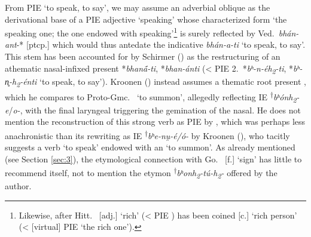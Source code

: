 \documentclass[output=paper,colorlinks,citecolor=brown]{langscibook}
\begin{document}
From PIE  ‘to speak, to say’, we may assume an adverbial oblique  as the derivational base of a  PIE adjective    ‘speaking’ whose characterized form  ‘the speaking one; the one endowed with speaking’\footnote{Likewise, after Hitt.\  [adj.] ‘rich’ (< PIE ) has been coined  [c.] ‘rich person’ (< [virtual] PIE  ‘the rich one’).} is surely reflected by Ved.\ \textit{bhán-ant}-* [ptcp.] which would thus antedate the indicative \textit{bhán-a-ti}  ‘to speak, to say’. This  stem has been accounted for by Schirmer () as the restructuring of an athematic nasal-infixed present  *\textit{bhan{ā́}-ti}, *\textit{bhan-ánti} (< PIE 2.\ *\textit{bʰ-n-éh\textsubscript{2}-ti}, *\textit{bʰ-n̥-h\textsubscript{2}-énti}  ‘to speak, to say’). Kroonen () instead assumes a thematic root present \mbox{,} which he compares to Proto-Gmc.\  ‘to summon’, allegedly reflecting IE \textsuperscript{†}\textit{bʰónh\textsubscript{2}}\textit{-e}/\textit{o-}, with the final laryngeal triggering the gemination of the nasal. He does not mention the reconstruction of this strong verb as PIE   by \citet[89]{Seebold1970}, which was perhaps less anachronistic than its rewriting as IE \textsuperscript{†}\textit{bʰe-nu̯-é/ó-} by Kroonen (), who tacitly suggests a verb  ‘to speak’ endowed with an    ‘to summon’. As already mentioned (see Section \ref{sec:3}), the etymological connection with Go.\  [f.] ‘sign’ has little to recommend itself, not to mention the etymon \textsuperscript{†}\textit{bʰonh\textsubscript{2}-tú-h\textsubscript{2}-} offered by the author.
\end{document}
